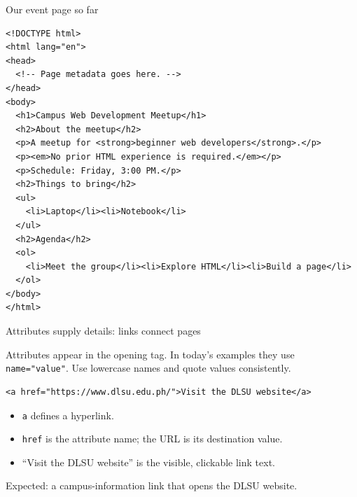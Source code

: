 \documentclass[aspectratio=169,12pt]{beamer}
\begin{document}
\begin{frame}[fragile]{Our event page so far}
\begin{lstlisting}[basicstyle=\ttfamily\fontsize{8}{8.5}\selectfont,aboveskip=0pt,belowskip=0pt]
<!DOCTYPE html>
<html lang="en">
<head>
  <!-- Page metadata goes here. -->
</head>
<body>
  <h1>Campus Web Development Meetup</h1>
  <h2>About the meetup</h2>
  <p>A meetup for <strong>beginner web developers</strong>.</p>
  <p><em>No prior HTML experience is required.</em></p>
  <p>Schedule: Friday, 3:00 PM.</p>
  <h2>Things to bring</h2>
  <ul>
    <li>Laptop</li><li>Notebook</li>
  </ul>
  <h2>Agenda</h2>
  <ol>
    <li>Meet the group</li><li>Explore HTML</li><li>Build a page</li>
  </ol>
</body>
</html>
\end{lstlisting}
\end{frame}

\begin{frame}[fragile]{Attributes supply details: links connect pages}
\begin{conceptblock}
Attributes appear in the opening tag. In today's examples they use \texttt{name="value"}. Use lowercase names and quote values consistently.
\end{conceptblock}
\begin{lstlisting}
<a href="https://www.dlsu.edu.ph/">Visit the DLSU website</a>
\end{lstlisting}

\begin{itemize}
\item \texttt{a} defines a hyperlink.
\item \texttt{href} is the attribute name; the URL is its destination value.
\item ``Visit the DLSU website'' is the visible, clickable link text.
\end{itemize}
\small Expected: a campus-information link that opens the DLSU website.
\end{frame}
\end{document}
